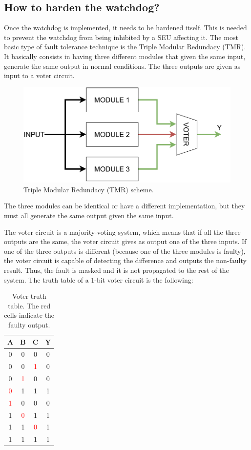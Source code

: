 \subsection{How to harden the watchdog?}

Once the watchdog is implemented, it needs to be hardened itself. This is needed to prevent the watchdog from being inhibited by a SEU affecting it. The most basic type of fault tolerance technique is the Triple Modular Redundacy (TMR). It basically consists in having three different modules that given the same input, generate the same output in normal conditions. The three outputs are given as input to a voter circuit.

\begin{figure}[H]
\centering
\includegraphics[width=0.9\linewidth]{images/chapter4/tmr.pdf}
\caption{Triple Modular Redundacy (TMR) scheme.}
\label{fig:tmr_scheme}
\end{figure}

The three modules can be identical or have a different implementation, but they must all generate the same output given the same input. \bigskip

The voter circuit is a majority-voting system, which means that if all the three outputs are the same, the voter circuit gives as output one of the three inputs. If one of the three outputs is different (because one of the three modules is faulty), the voter circuit is capable of detecting the difference and outputs the non-faulty result. Thus, the fault is masked and it is not propagated to the rest of the system. The truth table of a 1-bit voter circuit is the following:

\begin{table}[H]
\centering
\begin{tabular}{ ccc|c }
    \textbf{A}&\textbf{B}&\textbf{C}&\textbf{Y}\\
    \hline
    0&0&0&0\\
    0&0&\textcolor{red}1&0\\
    0&\textcolor{red}1&0&0\\
    \textcolor{red}0&1&1&1\\
    \textcolor{red}1&0&0&0\\
    1&\textcolor{red}0&1&1\\
    1&1&\textcolor{red}0&1\\
    1&1&1&1\\
\end{tabular}
\caption{Voter truth table. The red cells indicate the faulty output.}
\end{table}

